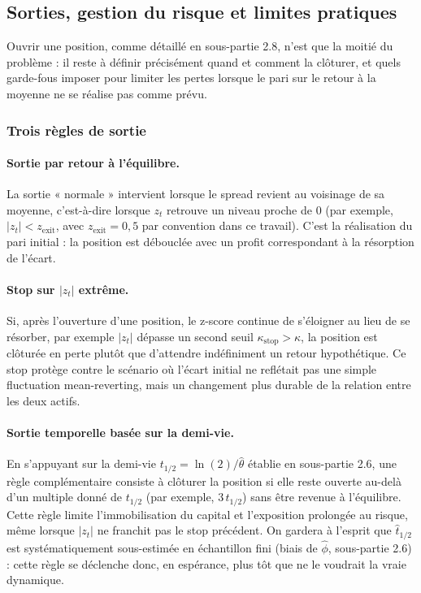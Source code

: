 \documentclass{article}
\begin{document}
\subsection{Sorties, gestion du risque et limites pratiques}
Ouvrir une position, comme détaillé en sous-partie 2.8, n'est que la moitié du problème : il reste à définir précisément quand et comment la clôturer, et quels garde-fous imposer pour limiter les pertes lorsque le pari sur le retour à la moyenne ne se réalise pas comme prévu.
\subsubsection*{Trois règles de sortie}
\paragraph{Sortie par retour à l'équilibre.} La sortie « normale » intervient lorsque le spread revient au voisinage de sa moyenne, c'est-à-dire lorsque $z_t$ retrouve un niveau proche de $0$ (par exemple, $|z_t| < z_{\text{exit}}$, avec $z_{\text{exit}}=0{,}5$ par convention dans ce travail). C'est la réalisation du pari initial : la position est débouclée avec un profit correspondant à la résorption de l'écart.
\paragraph{Stop sur $|z_t|$ extrême.} Si, après l'ouverture d'une position, le z-score continue de s'éloigner au lieu de se résorber, par exemple $|z_t|$ dépasse un second seuil $\kappa_{\text{stop}} > \kappa$, la position est clôturée en perte plutôt que d'attendre indéfiniment un retour hypothétique. Ce stop protège contre le scénario où l'écart initial ne reflétait pas une simple fluctuation mean-reverting, mais un changement plus durable de la relation entre les deux actifs.
\paragraph{Sortie temporelle basée sur la demi-vie.} En s'appuyant sur la demi-vie $t_{1/2} = \ln(2)/\hat\theta$ établie en sous-partie 2.6, une règle complémentaire consiste à clôturer la position si elle reste ouverte au-delà d'un multiple donné de $t_{1/2}$ (par exemple, $3\, t_{1/2}$) sans être revenue à l'équilibre. Cette règle limite l'immobilisation du capital et l'exposition prolongée au risque, même lorsque $|z_t|$ ne franchit pas le stop précédent. On gardera à l'esprit que $\hat t_{1/2}$ est systématiquement sous-estimée en échantillon fini (biais de $\hat\phi$, sous-partie 2.6) : cette règle se déclenche donc, en espérance, plus tôt que ne le voudrait la vraie dynamique.
\end{document}
